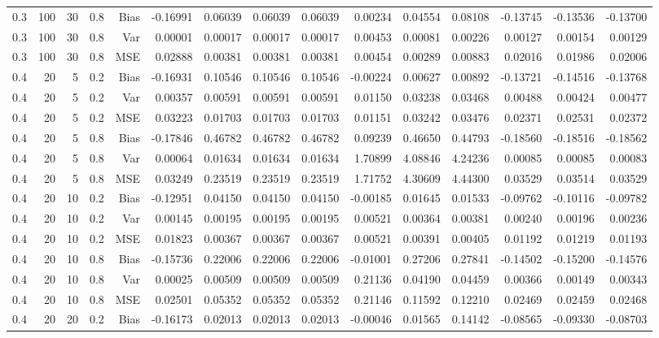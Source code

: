 \begin{table}[!htbp]
\begin{tabular}{lrrrrrrrrrrrrrr}
0.3 & 100 & 30 & 0.8 & Bias & -0.16991 & 0.06039 & 0.06039 & 0.06039 & 0.00234 & 0.04554 & 0.08108 & -0.13745 & -0.13536 & -0.13700 \\
0.3 & 100 & 30 & 0.8 & Var & 0.00001 & 0.00017 & 0.00017 & 0.00017 & 0.00453 & 0.00081 & 0.00226 & 0.00127 & 0.00154 & 0.00129 \\
0.3 & 100 & 30 & 0.8 & MSE & 0.02888 & 0.00381 & 0.00381 & 0.00381 & 0.00454 & 0.00289 & 0.00883 & 0.02016 & 0.01986 & 0.02006 \\
0.4 &  20 &  5 & 0.2 & Bias & -0.16931 & 0.10546 & 0.10546 & 0.10546 & -0.00224 & 0.00627 & 0.00892 & -0.13721 & -0.14516 & -0.13768 \\
0.4 &  20 &  5 & 0.2 & Var & 0.00357 & 0.00591 & 0.00591 & 0.00591 & 0.01150 & 0.03238 & 0.03468 & 0.00488 & 0.00424 & 0.00477 \\
0.4 &  20 &  5 & 0.2 & MSE & 0.03223 & 0.01703 & 0.01703 & 0.01703 & 0.01151 & 0.03242 & 0.03476 & 0.02371 & 0.02531 & 0.02372 \\
0.4 &  20 &  5 & 0.8 & Bias & -0.17846 & 0.46782 & 0.46782 & 0.46782 & 0.09239 & 0.46650 & 0.44793 & -0.18560 & -0.18516 & -0.18562 \\
0.4 &  20 &  5 & 0.8 & Var & 0.00064 & 0.01634 & 0.01634 & 0.01634 & 1.70899 & 4.08846 & 4.24236 & 0.00085 & 0.00085 & 0.00083 \\
0.4 &  20 &  5 & 0.8 & MSE & 0.03249 & 0.23519 & 0.23519 & 0.23519 & 1.71752 & 4.30609 & 4.44300 & 0.03529 & 0.03514 & 0.03529 \\
0.4 &  20 & 10 & 0.2 & Bias & -0.12951 & 0.04150 & 0.04150 & 0.04150 & -0.00185 & 0.01645 & 0.01533 & -0.09762 & -0.10116 & -0.09782 \\
0.4 &  20 & 10 & 0.2 & Var & 0.00145 & 0.00195 & 0.00195 & 0.00195 & 0.00521 & 0.00364 & 0.00381 & 0.00240 & 0.00196 & 0.00236 \\
0.4 &  20 & 10 & 0.2 & MSE & 0.01823 & 0.00367 & 0.00367 & 0.00367 & 0.00521 & 0.00391 & 0.00405 & 0.01192 & 0.01219 & 0.01193 \\
0.4 &  20 & 10 & 0.8 & Bias & -0.15736 & 0.22006 & 0.22006 & 0.22006 & -0.01001 & 0.27206 & 0.27841 & -0.14502 & -0.15200 & -0.14576 \\
0.4 &  20 & 10 & 0.8 & Var & 0.00025 & 0.00509 & 0.00509 & 0.00509 & 0.21136 & 0.04190 & 0.04459 & 0.00366 & 0.00149 & 0.00343 \\
0.4 &  20 & 10 & 0.8 & MSE & 0.02501 & 0.05352 & 0.05352 & 0.05352 & 0.21146 & 0.11592 & 0.12210 & 0.02469 & 0.02459 & 0.02468 \\
0.4 &  20 & 20 & 0.2 & Bias & -0.16173 & 0.02013 & 0.02013 & 0.02013 & -0.00046 & 0.01565 & 0.14142 & -0.08565 & -0.09330 & -0.08703 \\

\end{tabular}
\end{table}
